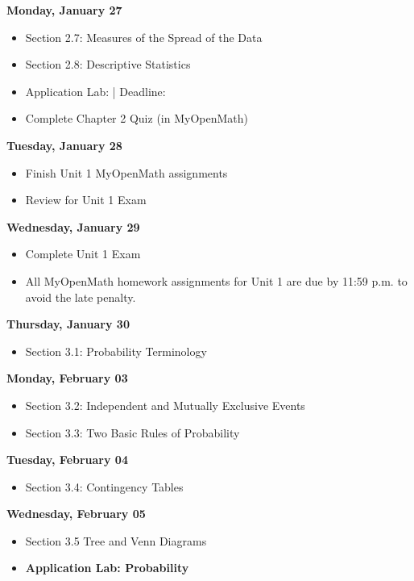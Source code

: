 \documentclass[11pt]{article}
\begin{document}
\textbf{Monday, January 27}

\begin{itemize}
\item Section 2.7: Measures of the Spread of the Data
\item Section 2.8: Descriptive Statistics
\item Application Lab: | Deadline:
\item Complete Chapter 2 Quiz (in MyOpenMath)
\end{itemize}

\textbf{Tuesday, January 28}

\begin{itemize}
\item Finish Unit 1 MyOpenMath assignments
\item Review for Unit 1 Exam
\end{itemize}

\textbf{Wednesday, January 29}

\begin{itemize}
\item Complete Unit 1 Exam
\item All MyOpenMath homework assignments for Unit 1 are due by 11:59 p.m. to avoid the late penalty.
\end{itemize}

\textbf{Thursday, January 30}

\begin{itemize}
\item Section 3.1: Probability Terminology
\end{itemize}

\textbf{Monday, February 03}

\begin{itemize}
\item Section 3.2: Independent and Mutually Exclusive Events
\item Section 3.3: Two Basic Rules of Probability
\end{itemize}

\textbf{Tuesday, February 04}

\begin{itemize}
\item Section 3.4: Contingency Tables
\end{itemize}

\textbf{Wednesday, February 05}

\begin{itemize}
\item Section 3.5 Tree and Venn Diagrams
\item \textbf{Application Lab: Probability}
\end{itemize}
\end{document}
